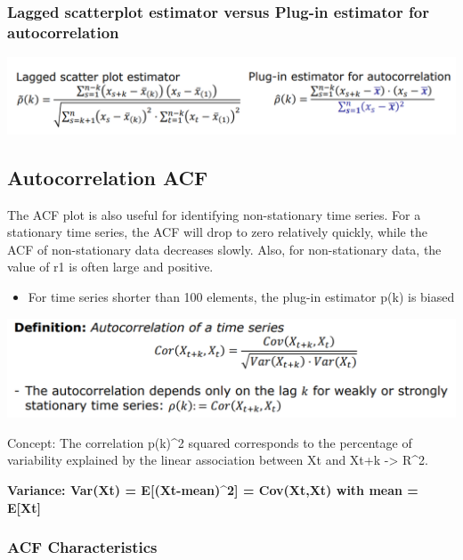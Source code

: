 \documentclass[
]{article}
\providecommand{\tightlist}{%
  \setlength{\itemsep}{0pt}\setlength{\parskip}{0pt}}
\begin{document}
\hypertarget{lagged-scatterplot-estimator-versus-plug-in-estimator-for-autocorrelation}{%
\subsubsection{Lagged scatterplot estimator versus Plug-in estimator for
autocorrelation}\label{lagged-scatterplot-estimator-versus-plug-in-estimator-for-autocorrelation}}

\includegraphics[width=1\linewidth]{lag_plug}

\hypertarget{autocorrelation-acf}{%
\subsection{Autocorrelation ACF}\label{autocorrelation-acf}}

The ACF plot is also useful for identifying non-stationary time series.
For a stationary time series, the ACF will drop to zero relatively
quickly, while the ACF of non-stationary data decreases slowly. Also,
for non-stationary data, the value of r1 is often large and positive.

\begin{itemize}
\tightlist
\item
  For time series shorter than 100 elements, the plug-in estimator p(k)
  is biased
\end{itemize}

\includegraphics[width=1\linewidth]{cor}

Concept: The correlation p(k)\^{}2 squared corresponds to the percentage
of variability explained by the linear association between Xt and Xt+k
-\textgreater{} R\^{}2.

\textbf{Variance: Var(Xt) = E{[}(Xt-mean)\^{}2{]} = Cov(Xt,Xt) with mean
= E{[}Xt{]}}

\hypertarget{acf-characteristics}{%
\subsubsection{ACF Characteristics}\label{acf-characteristics}}
\end{document}
